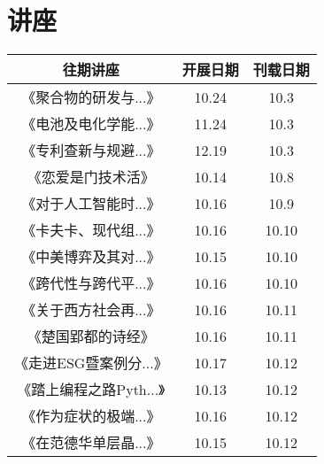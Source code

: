 \documentclass[letterpaper, 12pt]{article}
\begin{document}
\begin{multicols}{2}
\begin{tabular}{|c|c|c|}
    \hline
\end{tabular}

\section{讲座}
\begin{tabular}{|c|c|c|}
    \hline
    往期讲座 & 开展日期 & 刊载日期\\
    \hline\hline
    《聚合物的研发与...》 & 10.24 & 10.3\\
    《电池及电化学能...》 & 11.24 & 10.3\\
    《专利查新与规避...》 & 12.19 & 10.3\\
    《恋爱是门技术活》 & 10.14 & 10.8\\
    《对于人工智能时...》 & 10.16 & 10.9\\
    《卡夫卡、现代组...》 & 10.16 & 10.10\\
    《中美博弈及其对...》 & 10.15 & 10.10\\
    《跨代性与跨代平...》 & 10.16 & 10.10\\
    《关于西方社会再...》 & 10.16 & 10.11\\
    《楚国郢都的诗经》 & 10.16 & 10.11\\
    《走进ESG暨案例分...》 & 10.17 & 10.12\\
    《踏上编程之路Pyth...》 & 10.13 & 10.12\\
    《作为症状的极端...》 & 10.16 & 10.12\\
    《在范德华单层晶...》 & 10.15 & 10.12\\
      \hline
\end{tabular}\\\\


\end{multicols}
\end{document}
